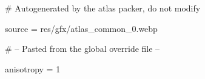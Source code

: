 # Autogenerated by the atlas packer, do not modify

source = res/gfx/atlas_common_0.webp

# -- Pasted from the global override file --

anisotropy = 1
